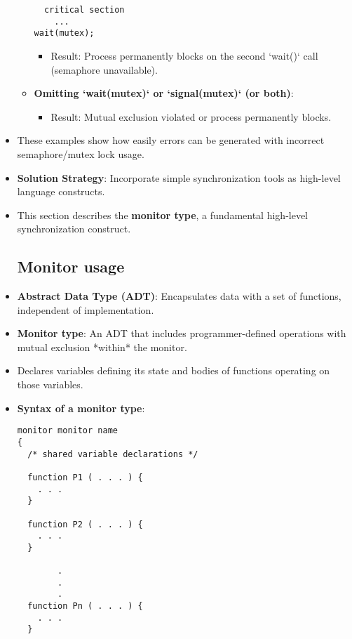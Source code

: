 \begin{itemize}
\begin{itemize}
\begin{verbatim}
  critical section
    ...
wait(mutex);
\end{verbatim}
        \begin{itemize}
            \item Result: Process permanently blocks on the second `wait()` call (semaphore unavailable).
        \end{itemize}
        \item \textbf{Omitting `wait(mutex)` or `signal(mutex)` (or both)}:
        \begin{itemize}
            \item Result: Mutual exclusion violated or process permanently blocks.
        \end{itemize}
    \end{itemize}
    \item These examples show how easily errors can be generated with incorrect semaphore/mutex lock usage.
    \item \textbf{Solution Strategy}: Incorporate simple synchronization tools as high-level language constructs.
    \item This section describes the \textbf{monitor type}, a fundamental high-level synchronization construct.

    \subsection{Monitor usage}
    \item \textbf{Abstract Data Type (ADT)}: Encapsulates data with a set of functions, independent of implementation.
    \item \textbf{Monitor type}: An ADT that includes programmer-defined operations with mutual exclusion *within* the monitor.
    \item Declares variables defining its state and bodies of functions operating on those variables.
    \item \textbf{Syntax of a monitor type}:
\begin{verbatim}
monitor monitor name
{
  /* shared variable declarations */
 
  function P1 ( . . . ) {
    . . .
  }
 
  function P2 ( . . . ) {
    . . .
  }
 
        .
        .
        .
  function Pn ( . . . ) {
    . . .
  }
 

\end{verbatim}
\end{itemize}
